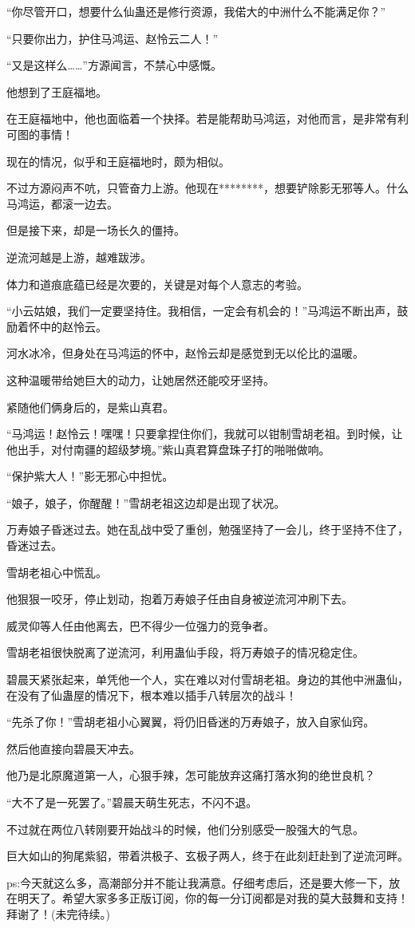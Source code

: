 \begin{this_body}
“你尽管开口，想要什么仙蛊还是修行资源，我偌大的中洲什么不能满足你？”

“只要你出力，护住马鸿运、赵怜云二人！”

“又是这样么……”方源闻言，不禁心中感慨。

他想到了王庭福地。

在王庭福地中，他也面临着一个抉择。若是能帮助马鸿运，对他而言，是非常有利可图的事情！

现在的情况，似乎和王庭福地时，颇为相似。

不过方源闷声不吭，只管奋力上游。他现在********，想要铲除影无邪等人。什么马鸿运，都滚一边去。

但是接下来，却是一场长久的僵持。

逆流河越是上游，越难跋涉。

体力和道痕底蕴已经是次要的，关键是对每个人意志的考验。

“小云姑娘，我们一定要坚持住。我相信，一定会有机会的！”马鸿运不断出声，鼓励着怀中的赵怜云。

河水冰冷，但身处在马鸿运的怀中，赵怜云却是感觉到无以伦比的温暖。

这种温暖带给她巨大的动力，让她居然还能咬牙坚持。

紧随他们俩身后的，是紫山真君。

“马鸿运！赵怜云！嘿嘿！只要拿捏住你们，我就可以钳制雪胡老祖。到时候，让他出手，对付南疆的超级梦境。”紫山真君算盘珠子打的啪啪做响。

“保护紫大人！”影无邪心中担忧。

“娘子，娘子，你醒醒！”雪胡老祖这边却是出现了状况。

万寿娘子昏迷过去。她在乱战中受了重创，勉强坚持了一会儿，终于坚持不住了，昏迷过去。

雪胡老祖心中慌乱。

他狠狠一咬牙，停止划动，抱着万寿娘子任由自身被逆流河冲刷下去。

威灵仰等人任由他离去，巴不得少一位强力的竞争者。

雪胡老祖很快脱离了逆流河，利用蛊仙手段，将万寿娘子的情况稳定住。

碧晨天紧张起来，单凭他一个人，实在难以对付雪胡老祖。身边的其他中洲蛊仙，在没有了仙蛊屋的情况下，根本难以插手八转层次的战斗！

“先杀了你！”雪胡老祖小心翼翼，将仍旧昏迷的万寿娘子，放入自家仙窍。

然后他直接向碧晨天冲去。

他乃是北原魔道第一人，心狠手辣，怎可能放弃这痛打落水狗的绝世良机？

“大不了是一死罢了。”碧晨天萌生死志，不闪不退。

不过就在两位八转刚要开始战斗的时候，他们分别感受一股强大的气息。

巨大如山的狗尾紫貂，带着洪极子、玄极子两人，终于在此刻赶赴到了逆流河畔。

ps:今天就这么多，高潮部分并不能让我满意。仔细考虑后，还是要大修一下，放在明天了。希望大家多多正版订阅，你的每一分订阅都是对我的莫大鼓舞和支持！拜谢了！(未完待续。)

\end{this_body}

